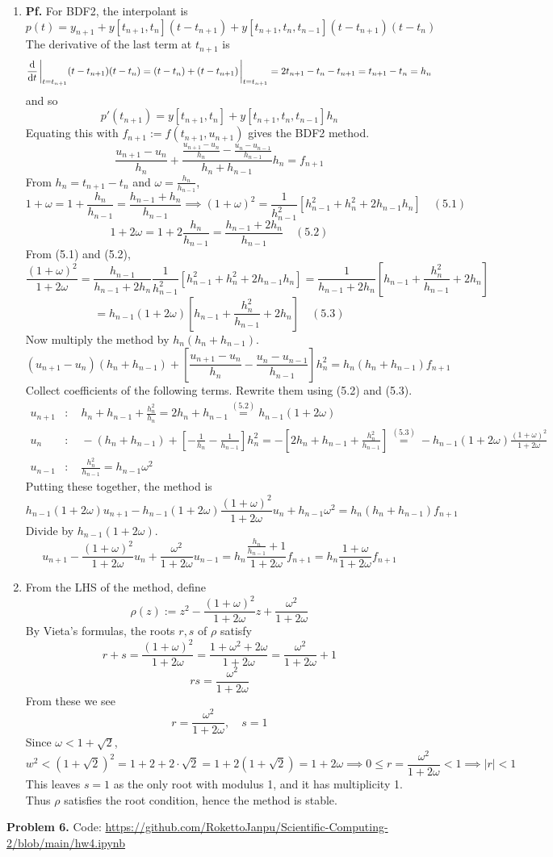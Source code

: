 \documentclass{article}
\def\tbf#1{\textbf{#1}}
\newcommand{\sbr}[1]{\left[#1\right]}
\newcommand{\pf}{\tbf{Pf. }}
\newcommand{\imp}{\implies}
\newcommand{\sep}[1][.5cm]{\vspace{#1}}
\newcommand{\om}{\omega}
\begin{document}
\begin{enumerate}[label=(\alph*)]
	
\item \pf For BDF2, the interpolant is
$$p(t) = y_{n+1} + y[t_{n+1},t_n](t-t_{n+1}) + y[t_{n+1},t_n,t_{n-1}](t-t_{n+1})(t-t_n)$$
The derivative of the last term at $t_{n+1}$ is
$$\dv{t}\eval_{t=t_{n+1}} (t-t_{n+1})(t-t_n)
= (t-t_{n})+(t-t_{n+1})\eval_{t=t_{n+1}}
= 2t_{n+1}-t_{n}-t_{n+1}
= t_{n+1}-t_n
= h_n$$
and so
$$p'(t_{n+1}) = y[t_{n+1},t_n] + y[t_{n+1},t_n,t_{n-1}]h_n$$
Equating this with $f_{n+1}:=f(t_{n+1},u_{n+1})$ gives the BDF2 method.
$$\frac{u_{n+1}-u_n}{h_n} + \frac{\frac{u_{n+1}-u_n}{h_n} - \frac{u_n-u_{n-1}}{h_{n-1}}}{h_n+h_{n-1}}h_n = f_{n+1}$$
From $h_n=t_{n+1}-t_n$ and $\om=\frac{h_n}{h_{n-1}}$,
$$1 + \om = 1 + \frac{h_n}{h_{n-1}} = \frac{h_{n-1}+h_n}{h_{n-1}}
\imp (1+\om)^2 = \frac{1}{h_{n-1}^2}\sbr{h_{n-1}^2+h_n^2+2h_{n-1}h_n} \quad (5.1)$$
$$1 + 2\om = 1 + 2\frac{h_n}{h_{n-1}} = \frac{h_{n-1}+2h_n}{h_{n-1}} \quad (5.2)$$
From (5.1) and (5.2),
$$\frac{(1+\om)^2}{1+2\om} = \frac{h_{n-1}}{h_{n-1}+2h_n}\frac{1}{h_{n-1}^2}\sbr{h_{n-1}^2+h_n^2+2h_{n-1}h_n}
= \frac{1}{h_{n-1}+2h_n}\sbr{h_{n-1}+\frac{h_n^2}{h_{n-1}}+2h_n}$$
$$= h_{n-1}(1+2\om)\sbr{h_{n-1}+\frac{h_n^2}{h_{n-1}}+2h_n} \quad (5.3)$$
Now multiply the method by $h_n(h_n+h_{n-1})$.
$$(u_{n+1}-u_n)(h_n+h_{n-1}) + \sbr{\frac{u_{n+1}-u_n}{h_n} - \frac{u_n-u_{n-1}}{h_{n-1}}}h_n^2 = h_n(h_n+h_{n-1})f_{n+1}$$
Collect coefficients of the following terms. Rewrite them using (5.2) and (5.3).
\begin{align*}
	u_{n+1} &: \quad h_n + h_{n-1} + \frac{h_n^2}{h_n} = 2h_n + h_{n-1} \overset{(5.2)}{=} h_{n-1}(1+2\om) \\
	u_n &: \quad -(h_n + h_{n-1}) + \sbr{-\frac{1}{h_n} - \frac{1}{h_{n-1}}}h_n^2 = -\sbr{2h_n + h_{n-1} + \frac{h_n^2}{h_{n-1}}} \overset{(5.3)}{=} -h_{n-1}(1+2\om)\frac{(1+\om)^2}{1+2\om} \\
	u_{n-1} &: \quad \frac{h_n^2}{h_{n-1}} = h_{n-1}\om^2
\end{align*}
Putting these together, the method is
$$h_{n-1}(1+2\om)u_{n+1} - h_{n-1}(1+2\om)\frac{(1+\om)^2}{1+2\om}u_n + h_{n-1}\om^2 = h_n(h_n+h_{n-1})f_{n+1}$$
Divide by $h_{n-1}(1+2\om)$.
$$u_{n+1} - \frac{(1+\om)^2}{1+2\om}u_n + \frac{\om^2}{1+2\om}u_{n-1} = h_n\frac{\frac{h_n}{h_{n-1}}+1}{1+2\om}f_{n+1}
= h_n\frac{1+\om}{1+2\om}f_{n+1}$$


\item From the LHS of the method, define
$$\rho(z) := z^2 - \frac{(1+\om)^2}{1+2\om}z + \frac{\om^2}{1+2\om}$$
By Vieta's formulas, the roots $r,s$ of $\rho$ satisfy
$$r + s = \frac{(1+\om)^2}{1+2\om} = \frac{1+\om^2+2\om}{1+2\om} = \frac{\om^2}{1+2\om} + 1$$
$$rs = \frac{\om^2}{1+2\om}$$
From these we see
$$r = \frac{\om^2}{1+2\om},
\quad s = 1$$
Since $\om<1+\sqrt2$,
$$w^2 < (1+\sqrt2)^2 = 1 + 2 + 2\cdot\sqrt2 = 1 + 2(1+\sqrt2) = 1 + 2\om
\imp 0 \le r = \frac{\om^2}{1+2\om} < 1
\imp |r|<1$$
This leaves $s=1$ as the only root with modulus 1, and it has multiplicity 1. Thus $\rho$ satisfies the root condition, hence the method is stable.

\end{enumerate}
\sep



\tbf{Problem 6.} Code: \url{https://github.com/RokettoJanpu/Scientific-Computing-2/blob/main/hw4.ipynb}
	
\end{document}
